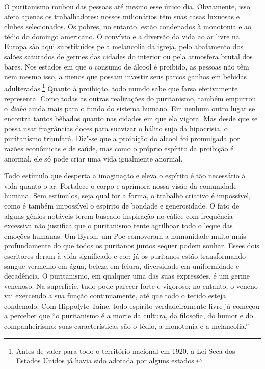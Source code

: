 O puritanismo roubou das pessoas até mesmo esse único dia. Obviamente,
isso afeta apenas os trabalhadores: nossos milionários têm suas casas
luxuosas e clubes selecionados. Os pobres, no entanto, estão condenados
à monotonia e ao tédio do domingo americano. O convívio e a diversão da
vida ao ar livre na Europa são aqui substituídos pela melancolia da
igreja, pelo abafamento dos salões saturados de germes das cidades do
interior ou pela atmosfera brutal dos bares. Nos estados em que o
consumo de álcool é proibido, as pessoas
não têm nem mesmo isso, a menos que possam investir seus parcos ganhos
em bebidas adulteradas.\footnote{Antes de valer para todo o território
  nacional em 1920, a Lei Seca dos Estados Unidos já havia sido adotada por alguns estados.}
Quanto à proibição, todo mundo sabe que farsa efetivamente representa.
Como todas as outras realizações do puritanismo, também empurrou o
\textit{diabo} ainda mais para o fundo do sistema humano. Em nenhum outro
lugar se encontra tantos bêbados quanto nas cidades em que ela vigora. 
Mas desde que se possa usar fragrâncias doces para suavizar o
hálito sujo da hipocrisia, o puritanismo triunfará. Diz"-se que a
proibição do álcool foi promulgada por razões econômicas e de saúde, mas
como o próprio espírito da proibição é anormal, ele só pode criar uma
vida igualmente anormal.

Todo estímulo que desperta a imaginação e eleva o espírito é tão
necessário à vida quanto o ar. Fortalece o corpo e aprimora nossa visão
da comunidade humana. Sem estímulos, seja qual for a forma, o trabalho
criativo é impossível, como é também impossível o espírito de bondade e
generosidade. O fato de alguns gênios notáveis terem buscado inspiração
no cálice com frequência excessiva não justifica que o puritanismo
tente agrilhoar todo o leque das emoções humanas. Um Byron, um Poe
comoveram a humanidade muito mais profundamente do que todos os
puritanos juntos sequer podem sonhar. Esses dois escritores deram à vida
significado e cor; já os puritanos estão transformando sangue vermelho
em água, beleza em feiura, diversidade em uniformidade e decadência. O
puritanismo, em qualquer uma das suas expressões, é um germe venenoso.
Na superfície, tudo pode parecer forte e vigoroso; no entanto, o veneno
vai exercendo a sua função continuamente, até que todo o tecido esteja
condenado. Com Hippolyte Taine, todo espírito verdadeiramente livre já
começou a perceber que ``o puritanismo é a morte da cultura, da
filosofia, do humor e do companheirismo; suas características são o
tédio, a monotonia e a melancolia.''

